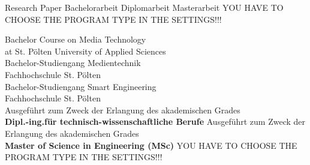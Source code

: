 \begin{center}

\vspace{1cm}

\begin{minipage}[t][5cm][s]{\textwidth}%
\centering
\Huge{{\color{FH2}{\fontsize{24}{30} \selectfont \workTitle\\}}}
\vspace{0.5cm}
\LARGE{{\color{FH2}{\fontsize{16}{24} \selectfont \subTitle\\}}}
\end{minipage}

\vspace{1cm}


\ifnum{}
\else{}
\fi{} 
   	\LARGE{Research Paper}
\else
	\ifnum{}
	\else{}
\fi{}
	\LARGE{Bachelorarbeit}
\else
	\ifuseMasterDigitalMediaTechnologies
		\LARGE{Diplomarbeit}
	\else
	\ifuseMasterDigitalHealthCare
		\LARGE{Masterarbeit}
    \else
        \LARGE{YOU HAVE TO CHOOSE THE PROGRAM TYPE IN THE SETTINGS!!!}
  	\fi
\fi\fi\fi



\vspace{1.3cm}
\ifuseBachelorMediaTechnologiesOne
	\fontsize{11pt}{15pt}\selectfont Bachelor Course on Media Technology\\
at St. Pölten University of Applied Sciences\\  
\else
	\ifuseBachelorMediaTechnologiesTwo
		\fontsize{11pt}{15pt}\selectfont Bachelor-Studiengang Medientechnik\\
Fachhochschule St. Pölten\\  
\else
	\ifuseBachelorSmartEngineeringOne
    	\fontsize{11pt}{15pt}\selectfont Bachelor-Studiengang Smart Engineering\\
Fachhochschule St. Pölten\\ 
\else
	\ifuseMasterDigitalMediaTechnologies
		\fontsize{11pt}{15pt}\selectfont Ausgeführt zum Zweck der Erlangung des akademischen Grades\\
		\textbf{Dipl.-ing.für technisch-wissenschaftliche Berufe}
\else
	\ifuseMasterDigitalHealthCare
    	\fontsize{11pt}{15pt}\selectfont Ausgeführt zum Zweck der Erlangung des akademischen Grades\\
		\textbf{Master of Science in Engineering (MSc)}
    \else
        \LARGE{YOU HAVE TO CHOOSE THE PROGRAM TYPE IN THE SETTINGS!!!}
  	\fi
\fi
\fi
\fi
\fi


\end{center}
